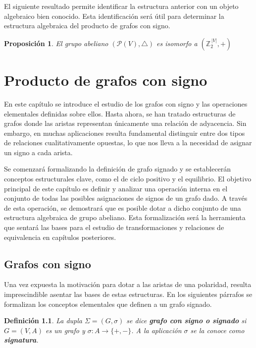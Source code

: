 \documentclass[11pt,a4paper,spanish]{report}
\theoremstyle{plain}
\newtheorem{proposicion}[teorema]{Proposición}
\newtheorem{definicion}{Definición}[chapter]
\begin{document}
El siguiente resultado permite identificar la estructura anterior
con un objeto algebraico bien conocido. Esta identificación será útil para determinar la estructura algebraica del producto de grafos con signo.

\begin{proposicion}\label{prop3.13}\cite{doerr2013applied}
El grupo abeliano $(\mathcal{P}(V),\triangle)$ es isomorfo a $(\mathbb{Z}_2^{\,|V|},+)$
\end{proposicion}


\chapter{Producto de grafos con signo}\label{C3}

En este capítulo se introduce el estudio de los grafos con signo y las operaciones elementales definidas sobre ellos. Hasta ahora, se han tratado estructuras de grafos donde las aristas representan únicamente una relación de adyacencia. Sin embargo, en muchas aplicaciones resulta fundamental distinguir entre dos tipos de relaciones cualitativamente opuestas, lo que nos lleva a la necesidad de asignar un signo a cada arista.

Se comenzará formalizando la definición de grafo signado y se establecerán conceptos estructurales clave, como el de ciclo positivo y el equilibrio. El objetivo principal de este capítulo es definir y analizar una operación interna en el conjunto de todas las posibles asignaciones de signos de un grafo dado. A través de esta operación, se demostrará que es posible dotar a dicho conjunto de una estructura algebraica de grupo abeliano. Esta formalización será la herramienta que sentará las bases para el estudio de transformaciones y relaciones de equivalencia en capítulos posteriores.

\section{Grafos con signo}
Una vez expuesta la motivación para dotar a las aristas de una polaridad, resulta imprescindible asentar las bases de estas estructuras. En los siguientes párrafos se formalizan los conceptos elementales que definen a un grafo signado.


\begin{definicion}\cite{harary1953notion}
La dupla $\Sigma=(G,\sigma)$ se dice \textbf{grafo con signo o signado} si $G=(V,A)$ es un grafo y $\sigma:A\to \{+,-\}$. A la aplicación $\sigma$ se la conoce como \textbf{signatura}.
\end{definicion} 
\end{document}
